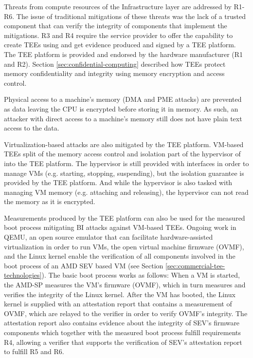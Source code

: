 Threats from compute resources of the Infrastructure layer are addressed by
R1-R6. The issue of traditional mitigations of these threats was the lack of a
trusted component that can verify the integrity of components that implement the
mitigations. R3 and R4 require the service provider to offer the capability to
create TEEs using and get evidence produced and signed by a TEE platform. The
TEE platform is provided and endorsed by the hardware manufacturer (R1 and R2).
Section \ref{sec:confidential-computing} described how TEEs protect memory
confidentiality and integrity using memory encryption and access control.

Physical access to a machine's memory (DMA and PME attacks) are prevented as
data leaving the CPU is encrypted before storing it in memory. As such, an
attacker with direct access to a machine's memory still does not have plain text
access to the data.

Virtualization-based attacks are also mitigated by the TEE platform. VM-based
TEEs split of the memory access control and isolation part of the hypervisor of
into the TEE platform. The hypervisor is still provided with interfaces in order
to manage VMs (e.g. starting, stopping, suspending), but the isolation guarantee
is provided by the TEE platform. And while the hypervisor is also tasked with
managing VM memory (e.g. attaching and releasing), the hypervisor can not read
the memory as it is encrypted.

Measurements produced by the TEE platform can also be used for the measured boot
process mitigating BI attacks against VM-based TEEs. Ongoing work in QEMU, an
open source emulator that can facilitate hardware-assisted virtualization in
order to run VMs, the open virtual machine firmware (OVMF), and the Linux kernel
enable the verification of all components involved in the boot process of an AMD
SEV based VM (see Section \ref{sec:commercial-tee-technologies}). The basic boot
process works as follows: When a VM is started, the AMD-SP measures the VM's
firmware (OVMF), which in turn measures and verifies the integrity of the Linux
kernel. After the VM has booted, the Linux kernel is supplied with an
attestation report that contains a measurement of OVMF, which are relayed to the
verifier in order to verify OVMF's integrity. The attestation report also
contains evidence about the integrity of SEV's firmware components which
together with the measured boot process fulfill requirements R4, allowing a
verifier that supports the verification of SEV's attestation report to fulfill
R5 and R6.

